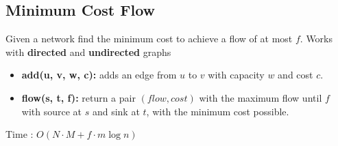 \subsection{Minimum Cost Flow}

Given a network find the minimum cost to achieve a flow of at most $f$. Works with \textbf{directed} and \textbf{undirected} graphs


\begin{itemize}
  \item \textbf{add(u, v, w, c):} adds an edge from $u$ to $v$ with capacity $w$ and cost $c$.
  \item \textbf{flow(s, t, f):} return a pair $(flow, cost)$ with the maximum flow until $f$ with source at $s$ and sink at $t$, with the minimum cost possible.
\end{itemize}

Time : $O(N \cdot M + f \cdot m \log{n})$

